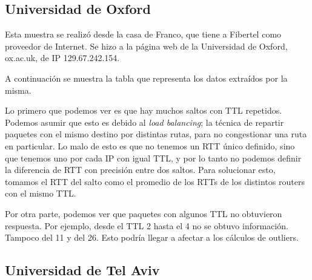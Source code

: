 \subsection{Universidad de Oxford}
Esta muestra se realizó desde la casa de Franco, que tiene a Fibertel 
como proveedor de Internet. Se hizo a la página web de la Universidad de Oxford,
ox.ac.uk, de IP 129.67.242.154. 

A continuación se muestra la tabla que representa los datos extraídos por la
misma.



Lo primero que podemos ver es que hay muchos saltos con TTL repetidos. Podemos
asumir que esto es debido al \emph{load balancing}; la técnica de repartir
paquetes con el mismo destino por distintas rutas, para no congestionar una
ruta en particular. Lo malo de esto es que no tenemos un RTT único definido,
sino que tenemos uno por cada IP con igual TTL, y por lo tanto no podemos
definir la diferencia de RTT con precisión entre dos saltos.
Para solucionar esto, tomamos el RTT del salto como el promedio de los RTTs
de los distintos routers con el mismo TTL.

Por otra parte, podemos ver que paquetes con algunos TTL no obtuvieron
respuesta. Por ejemplo, desde el TTL 2 hasta el 4 no se obtuvo información. 
Tampoco del 11 y del 26. Esto podría llegar a afectar a los cálculos de outliers.



\subsection{Universidad de Tel Aviv}
